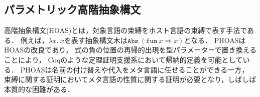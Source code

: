 \documentclass[T]{compsoft}
\begin{document}
%
%

\subsection{パラメトリック高階抽象構文}
高階抽象構文(HOAS)とは，対象言語の束縛をホスト言語の束縛で表す手法である．
例えば，$\lambda x.~x$を表す抽象構文木は$\texttt{Abs}~(\texttt{fun}~x \Rightarrow x)$となる．
PHOAS\cite{Chlipala:2008:PHA:1411204.1411226}はHOASの改良であり，
式の負の位置の再帰的出現を型パラメーターで置き換えることにより，
Coqのような定理証明支援系において帰納的定義を可能としている．
PHOASは名前の付け替えや代入をメタ言語に任せることができる一方，
束縛に関する証明においてメタ言語の性質に関する証明が必要となり，しばしば本質的な困難がある．

%
\end{document}
